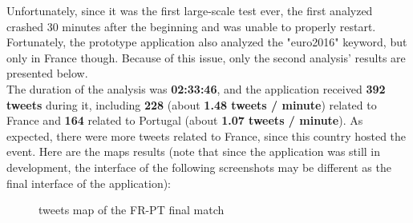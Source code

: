 \documentclass[a4paper,11pt]{report}
\begin{document}
Unfortunately, since it was the first large-scale test ever, the first analyzed crashed 30 minutes after the beginning and was unable to properly restart. Fortunately, the prototype application also analyzed the "euro2016" keyword, but only in France though. Because of this issue, only the second analysis' results are presented below.\\

The duration of the analysis was \textbf{02:33:46}, and the application received \textbf{392 tweets} during it, including \textbf{228} (about \textbf{1.48 tweets / minute}) related to France and \textbf{164} related to Portugal (about \textbf{1.07 tweets / minute}). As expected, there were more tweets related to France, since this country hosted the event. Here are the maps results (note that since the application was still in development, the interface of the following screenshots may be different as the final interface of the application):
\begin{figure}[H]
\vspace{-5pt}
\begin{center}
\vspace{-20pt}
\caption{tweets map of the FR-PT final match}
\end{center}
\end{figure}
\vspace{-10pt}
\newpage
\end{document}
